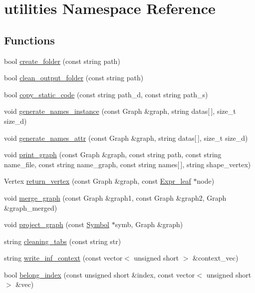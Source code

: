 \hypertarget{namespaceutilities}{
\section{utilities Namespace Reference}
\label{namespaceutilities}
}
\subsection*{Functions}
\begin{DoxyCompactItemize}
\item 
bool \hyperlink{namespaceutilities_a87fbb9605f1b59c54b95e708e1e9935b}{create\_\-folder} (const string path)
\item 
bool \hyperlink{namespaceutilities_a28f2ace508b6ea5bc7af05b84f0b2487}{clean\_\-output\_\-folder} (const string path)
\item 
bool \hyperlink{namespaceutilities_a3800a71dd15748ff83861140b4119b24}{copy\_\-static\_\-code} (const string path\_\-d, const string path\_\-s)
\item 
void \hyperlink{namespaceutilities_a0e49bfde1f01bb5567770fc492e6929f}{generate\_\-names\_\-instance} (const Graph \&graph, string datas\mbox{[}$\,$\mbox{]}, size\_\-t size\_\-d)
\item 
void \hyperlink{namespaceutilities_ac88e50b1c88f16e0d052555d773b7be5}{generate\_\-names\_\-attr} (const Graph \&graph, string datas\mbox{[}$\,$\mbox{]}, size\_\-t size\_\-d)
\item 
void \hyperlink{namespaceutilities_ae0c73d526799122fa0d85cd45b6d4fbb}{print\_\-graph} (const Graph \&graph, const string path, const string name\_\-file, const string name\_\-graph, const string names\mbox{[}$\,$\mbox{]}, string shape\_\-vertex)
\item 
Vertex \hyperlink{namespaceutilities_a13764073c6966781a6680ab58d88c1b5}{return\_\-vertex} (const Graph \&graph, const \hyperlink{classgenevalmag_1_1Expr__leaf}{Expr\_\-leaf} $\ast$node)
\item 
void \hyperlink{namespaceutilities_ad0de56d624d099e4d9a5f605ca80b2e5}{merge\_\-graph} (const Graph \&graph1, const Graph \&graph2, Graph \&graph\_\-merged)
\item 
void \hyperlink{namespaceutilities_af78e9e1ebc91d6896a01f45d611cca0a}{project\_\-graph} (const \hyperlink{classgenevalmag_1_1Symbol}{Symbol} $\ast$symb, Graph \&graph)
\item 
string \hyperlink{namespaceutilities_a644dfdb507e47adf60e6984d28e080fd}{cleaning\_\-tabs} (const string str)
\item 
string \hyperlink{namespaceutilities_a21bbcd26f651d4ceb798b50af71c7b29}{write\_\-inf\_\-context} (const vector$<$ unsigned short $>$ \&context\_\-vec)
\item 
bool \hyperlink{namespaceutilities_aa452cf7f1132b5d667bdeefffb33425f}{belong\_\-index} (const unsigned short \&index, const vector$<$ unsigned short $>$ \&vec)
\end{DoxyCompactItemize}


